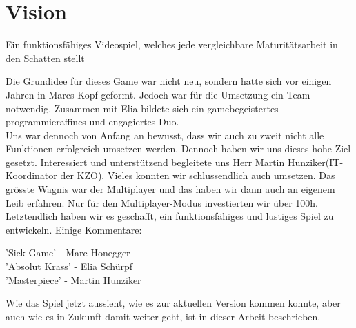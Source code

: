 \chapter{Vision}
\begin{center}
    Ein funktionsfähiges Videospiel, welches jede vergleichbare Maturitätsarbeit in den Schatten stellt\\
\end{center}
Die Grundidee für dieses Game war nicht neu, sondern hatte sich vor einigen Jahren in  Marcs Kopf geformt.
Jedoch war für die Umsetzung ein Team notwendig. Zusammen mit Elia bildete sich ein gamebegeistertes programmieraffines und engagiertes Duo.\\
Uns war dennoch von Anfang an bewusst,
dass wir auch zu zweit nicht alle Funktionen erfolgreich umsetzen werden. Dennoch haben wir uns dieses hohe Ziel gesetzt. Interessiert und 
unterstützend begleitete uns Herr Martin Hunziker(IT-Koordinator der KZO).
Vieles konnten wir schlussendlich auch umsetzen.
Das grösste Wagnis war der Multiplayer und das haben wir dann auch an eigenem Leib erfahren.
Nur für den Multiplayer-Modus investierten wir über 100h.\\
Letztendlich haben wir es geschafft, ein funktionsfähiges und lustiges Spiel zu entwickeln.
Einige Kommentare:
\begin{center}
    'Sick Game' - Marc Honegger \\
    'Absolut Krass' - Elia Schürpf \\ 
    'Masterpiece' - Martin Hunziker
\end{center}
Wie das Spiel jetzt aussieht, wie es zur aktuellen Version kommen konnte, aber auch wie es in Zukunft damit weiter geht, ist in dieser Arbeit beschrieben.